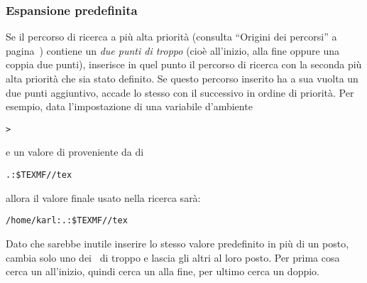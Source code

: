 \documentclass{article}
\begin{document}
\subsubsection{Espansione predefinita}
\label{sec:default-expansion}

Se il percorso di ricerca a più alta priorità (consulta ``Origini dei
percorsi'' a pagina~\pageref{sec:path-sources}) contiene un \emph{due
punti di troppo} (cioè all'inizio, alla fine oppure una coppia due punti),
\KPS{} inserisce in quel punto il percorso di ricerca con la seconda più
alta priorità che sia stato definito. Se questo percorso inserito ha a sua
vuolta un due punti aggiuntivo, accade lo stesso con il successivo in
ordine di priorità. Per esempio, data l'impostazione di una variabile
d'ambiente


\begin{alltt}
> 
\end{alltt}
e un valore di  proveniente da  di

\begin{alltt}
  .:\$TEXMF//tex
\end{alltt}
allora il valore finale usato nella ricerca sarà:

\begin{alltt}
  /home/karl:.:\$TEXMF//tex
\end{alltt}

Dato che sarebbe inutile inserire lo stesso valore predefinito in più di
un posto, \KPS{} cambia solo uno dei \samp{:}\ di troppo e lascia gli
altri al loro posto. Per prima cosa cerca un \samp{:} all'inizio, quindi
cerca un \samp{:} alla fine, per ultimo cerca un \samp{:} doppio.
\end{document}
